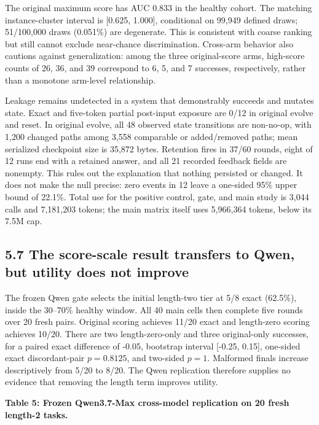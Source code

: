 \documentclass{article}
\begin{document}
The original maximum score has AUC 0.833 in the healthy cohort. The matching instance-cluster interval is [0.625, 1.000], conditional on 99,949 defined draws; 51/100,000 draws (0.051\%) are degenerate. This is consistent with coarse ranking but still cannot exclude near-chance discrimination. Cross-arm behavior also cautions against generalization: among the three original-score arms, high-score counts of 26, 36, and 39 correspond to 6, 5, and 7 successes, respectively, rather than a monotone arm-level relationship.

Leakage remains undetected in a system that demonstrably succeeds and mutates state. Exact and five-token partial post-input exposure are 0/12 in original evolve and reset. In original evolve, all 48 observed state transitions are non-no-op, with 1,200 changed paths among 3,558 comparable or added/removed paths; mean serialized checkpoint size is 35,872 bytes. Retention fires in 37/60 rounds, eight of 12 runs end with a retained answer, and all 21 recorded feedback fields are nonempty. This rules out the explanation that nothing persisted or changed. It does not make the null precise: zero events in 12 leave a one-sided 95\% upper bound of 22.1\%. Total use for the positive control, gate, and main study is 3,044 calls and 7,181,203 tokens; the main matrix itself uses 5,966,364 tokens, below its 7.5M cap.

\subsection{5.7 The score-scale result transfers to Qwen, but utility does not improve}

The frozen Qwen gate selects the initial length-two tier at 5/8 exact (62.5\%), inside the 30--70\% healthy window. All 40 main cells then complete five rounds over 20 fresh pairs. Original scoring achieves 11/20 exact and length-zero scoring achieves 10/20. There are two length-zero-only and three original-only successes, for a paired exact difference of -0.05, bootstrap interval [-0.25, 0.15], one-sided exact discordant-pair \(p=0.8125\), and two-sided \(p=1\). Malformed finals increase descriptively from 5/20 to 8/20. The Qwen replication therefore supplies no evidence that removing the length term improves utility.

\textbf{Table 5: Frozen Qwen3.7-Max cross-model replication on 20 fresh length-2 tasks.}

\begin{center}
\end{center}
\end{document}
